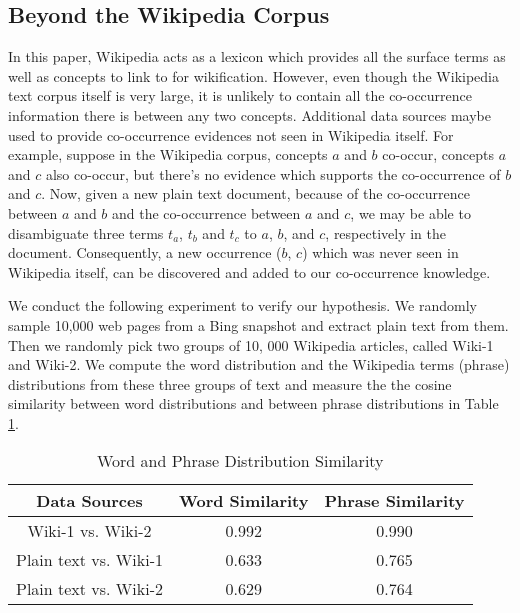 \subsection{Beyond the Wikipedia Corpus}
In this paper, Wikipedia acts as a lexicon which provides all the
surface terms as well as concepts to link to for wikification.
However, even though the Wikipedia text
corpus itself is very large, it is unlikely to contain all the co-occurrence
information there is between any two concepts. Additional data sources maybe
used to provide co-occurrence evidences not seen in Wikipedia itself.
For example, suppose in the Wikipedia corpus, concepts $a$ and $b$ co-occur,
concepts $a$ and $c$ also co-occur, but there's no evidence which supports
the co-occurrence of $b$ and $c$. Now, given a new plain text document, because of the co-occurrence between $a$ and $b$ and the co-occurrence between $a$ and $c$,
we may be able to disambiguate three terms $t_a$, $t_b$ and $t_c$ to $a$, $b$,
and $c$, respectively in the document. Consequently, a new occurrence ($b$, $c$)
which was never seen in Wikipedia itself, can be discovered and added to our
co-occurrence knowledge.

We conduct the following experiment to verify our hypothesis.
We randomly sample 10,000 web pages from a Bing snapshot and
extract plain text from them.
Then we randomly pick two groups of 10, 000 Wikipedia articles, called
Wiki-1 and Wiki-2. We compute the word distribution and the Wikipedia terms
(phrase) distributions from these three groups of text and measure the
the cosine similarity between word distributions and between
phrase distributions in Table \ref{tab:vector}.

\begin{table}[th]
\centering
\begin{tabular}{|c|c|c|}
\hline
Data Sources           &  Word Similarity &  Phrase Similarity \\
\hline \hline
Wiki-1 vs. Wiki-2 &      0.992 &       0.990 \\
Plain text vs. Wiki-1 &      0.633 &      0.765 \\
Plain text vs. Wiki-2 &      0.629 &      0.764 \\
\hline
\end{tabular}
\caption{Word and Phrase Distribution Similarity}
\label{tab:vector}
\end{table}

